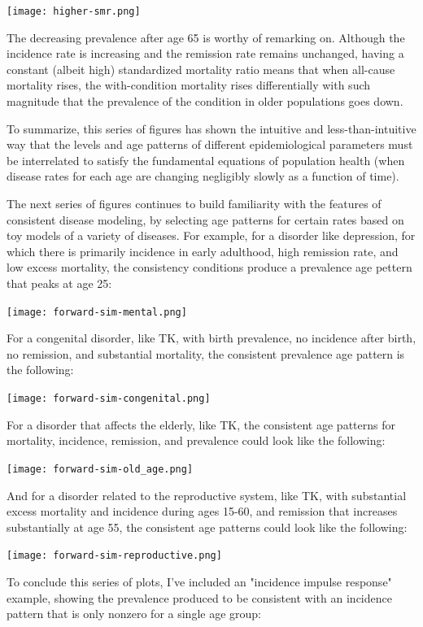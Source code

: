 \texttt{[image: higher-smr.png]}

The decreasing prevalence after age 65 is worthy of remarking
on. Although the incidence rate is increasing and the remission rate
remains unchanged, having a constant (albeit high) standardized
mortality ratio means that when all-cause mortality rises, the
with-condition mortality rises differentially with such magnitude that
the prevalence of the condition in older populations goes down.

To summarize, this series of figures has shown the intuitive and
less-than-intuitive way that the levels and age patterns of different
epidemiological parameters must be interrelated to satisfy the
fundamental equations of population health (when disease rates for
each age are changing negligibly slowly as a function of time).

The next series of figures continues to build familiarity with the
features of consistent disease modeling, by selecting age patterns for
certain rates based on toy models of a variety of diseases.  For
example, for a disorder like depression, for which there is primarily
incidence in early adulthood, high remission rate, and low excess
mortality, the consistency conditions produce a prevalence age pettern
that peaks at age 25: 

\texttt{[image: forward-sim-mental.png]}

For a congenital disorder, like TK, with birth prevalence, no
incidence after birth, no remission, and substantial mortality, the
consistent prevalence age pattern is the following:

\texttt{[image: forward-sim-congenital.png]}

For a disorder that affects the elderly, like TK, the consistent age
patterns for mortality, incidence, remission, and prevalence could
look like the following: 

\texttt{[image: forward-sim-old\_age.png]}

And for a disorder related to the reproductive system, like TK, with
substantial excess mortality and incidence during ages 15-60, and
remission that increases substantially at age 55, the consistent age
patterns could look like the following: 

\texttt{[image: forward-sim-reproductive.png]}

To conclude this series of plots, I've included an "incidence impulse
response" example, showing the prevalence produced to be consistent
with an incidence pattern that is only nonzero for a single age group:

